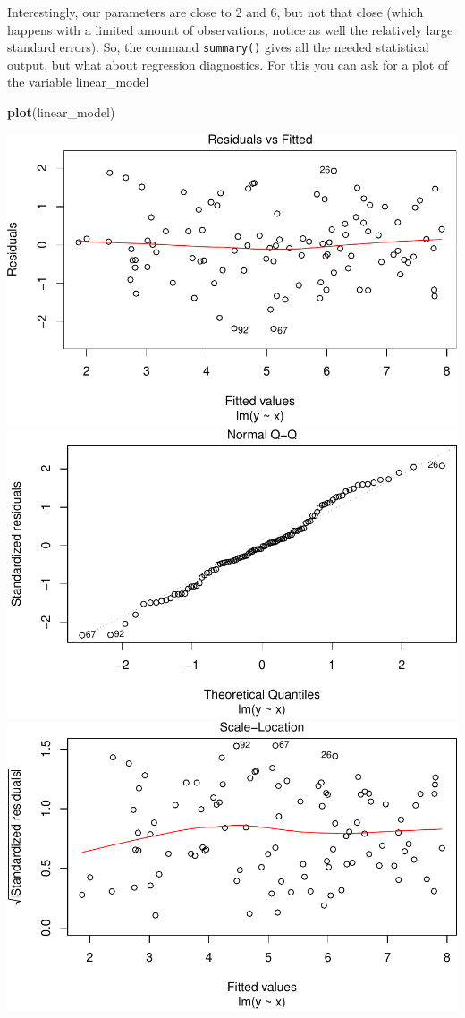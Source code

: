 \documentclass[]{article}
\newenvironment{Shaded}{\begin{snugshade}}{\end{snugshade}}
\newcommand{\KeywordTok}[1]{\textcolor[rgb]{0.13,0.29,0.53}{\textbf{{#1}}}}
\newcommand{\NormalTok}[1]{{#1}}
\theoremstyle{definition}
\theoremstyle{definition}
\theoremstyle{definition}
\theoremstyle{remark}
\begin{document}
Interestingly, our parameters are close to 2 and 6, but not that close
(which happens with a limited amount of observations, notice as well the
relatively large standard errors). So, the command \texttt{summary()}
gives all the needed statistical output, but what about regression
diagnostics. For this you can ask for a plot of the variable
linear\_model

\begin{Shaded}
\begin{Highlighting}[]
\KeywordTok{plot}\NormalTok{(linear_model)}
\end{Highlighting}
\end{Shaded}

\includegraphics{./unnamed-chunk-26-1.pdf}
\includegraphics{./unnamed-chunk-26-2.pdf}
\includegraphics{./unnamed-chunk-26-3.pdf}
\end{document}

